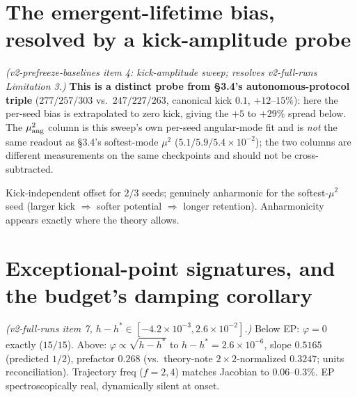 \documentclass[10pt]{article}
\begin{document}
\section{The emergent-lifetime bias, resolved by a kick-amplitude probe}\label{app:bias}
\emph{(v2-prefreeze-baselines item 4: kick-amplitude sweep; resolves v2-full-runs Limitation 3.)} \textbf{This is a distinct probe from \S3.4's autonomous-protocol triple} ($277/257/303$ vs.\ $247/227/263$, canonical kick $0.1$, $+12$--$15\%$): here the per-seed bias is extrapolated to zero kick, giving the $+5$ to $+29\%$ spread below. The $\mu^2_{\rm ang}$ column is this sweep's own per-seed angular-mode fit and is \emph{not} the same readout as \S3.4's softest-mode $\mu^2$ ($5.1/5.9/5.4{\times}10^{-2}$); the two columns are different measurements on the same checkpoints and should not be cross-subtracted.
\begin{center}\small
{}
\end{center}
Kick-independent offset for $2/3$ seeds; genuinely anharmonic for the softest-$\mu^2$ seed (larger kick $\Rightarrow$ softer potential $\Rightarrow$ longer retention). Anharmonicity appears exactly where the theory allows.

\section{Exceptional-point signatures, and the budget's damping corollary}\label{app:ep}
\emph{(v2-full-runs item 7, $h-h^*\in[-4.2{\times}10^{-3},2.6{\times}10^{-2}]$.)} Below EP: $\varphi=0$ exactly ($15/15$). Above: $\varphi\propto\sqrt{h-h^*}$ to $h-h^*=2.6{\times}10^{-6}$, slope $0.5165$ (predicted $1/2$), prefactor $0.268$ (vs.\ theory-note $2\times2$-normalized $0.3247$; units reconciliation). Trajectory freq ($f=2,4$) matches Jacobian to $0.06$--$0.3\%$. EP spectroscopically real, dynamically silent at onset.
\end{document}

